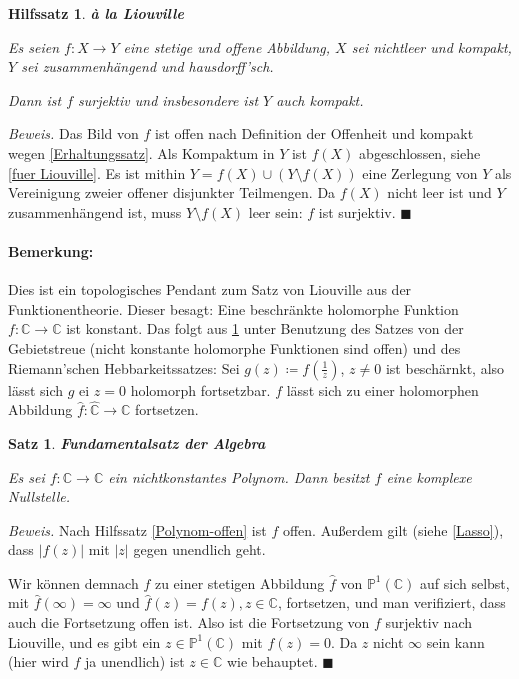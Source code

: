 \documentclass[12pt]{scrbook}   %
\newtheorem{satzX}[alles]{Satz}
\newenvironment{satz}[1]{\begin{satzX}{\bf #1}\nopagebreak\par}{\end{satzX}}
\newtheorem{hilfsX}[alles]{Hilfssatz}
\newenvironment{hilfs}[1]{\begin{hilfsX}{\bf #1}\par}{\end{hilfsX}}
\newcommand{\qed}{\phantom{.}\hfill{$\blacksquare$}}
\newcommand{\da}{\coloneqq}
\begin{document}
\begin{hilfs}{\`a la Liouville}\label{Liouville}

Es seien $f:X\longrightarrow Y$ eine stetige und offene Abbildung, $X$ sei 
nichtleer und kompakt, $Y$ sei zusammenhängend und hausdorff'sch.

Dann ist $f$ surjektiv und insbesondere ist $Y$ auch kompakt.

\end{hilfs}

{\it Beweis.} Das Bild von $f$ ist offen nach Definition der Offenheit und
kompakt wegen \ref{Erhaltungssatz}. Als Kompaktum in $Y$ ist $f(X)$ 
abgeschlossen, siehe \ref{fuer Liouville}. Es ist mithin 
$Y= f(X) \cup (Y\setminus f(X))$ eine Zerlegung von $Y$ als Vereinigung
zweier offener disjunkter Teilmengen. Da $f(X)$ nicht leer ist und $Y$
zusammenhängend ist, muss $Y\setminus f(X)$ leer sein: $f$ ist 
surjektiv. \qed

\paragraph{Bemerkung:} Dies ist ein topologisches Pendant zum Satz von Liouville aus der Funktionentheorie. Dieser besagt: Eine beschränkte holomorphe Funktion $f:\mathbb C\to\mathbb C$ ist konstant. Das folgt aus \ref{Liouville} unter Benutzung des Satzes von der Gebietstreue (nicht konstante holomorphe Funktionen sind offen) und des Riemann’schen Hebbarkeitssatzes: Sei $g(z)\da f(\frac 1z)$, $z\ne 0$ ist beschärnkt, also lässt sich $g$ ei $z=0$ holomorph fortsetzbar. $f$ lässt sich zu einer holomorphen Abbildung $\hat f :\mathbb {\hat C}\to \mathbb C$ fortsetzen.

\begin{satz}{Fundamentalsatz der Algebra}
 \label{Fundamentalsatz} 

Es sei $f:\mathbb C\longrightarrow \mathbb C$ ein nichtkonstantes Polynom. 
Dann besitzt $f$ eine komplexe Nullstelle.

\end{satz}

{\it Beweis.} Nach Hilfssatz \ref{Polynom-offen} ist $f$ offen. Außerdem 
gilt (siehe \ref{Lasso}), dass $|f(z)|$ mit $|z|$ gegen unendlich geht. 

Wir können demnach $f$ zu einer stetigen Abbildung  $\hat f$ von 
$\mathbb P^1(\mathbb C)$ auf sich selbst, mit $\hat f(\infty) = \infty$ und $\hat f(z)=f(z), z\in \mathbb C$, fortsetzen, und man verifiziert, dass
auch die Fortsetzung offen ist. Also ist die Fortsetzung von $f$ surjektiv nach
Liouville, und es gibt ein $z\in\mathbb P^1(\mathbb C)$ mit $f(z) = 0.$
Da $z$ nicht $\infty$ sein kann (hier wird $f$ ja unendlich) ist $z\in 
\mathbb C$ wie behauptet. 
\qed
\end{document}
